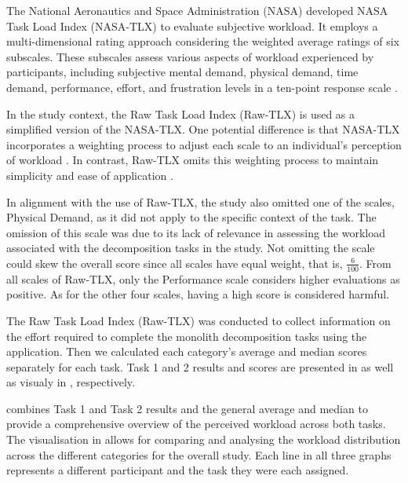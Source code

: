 The National Aeronautics and Space Administration (NASA) developed NASA Task
Load Index (NASA-TLX) to evaluate subjective workload. It employs a
multi-dimensional rating approach considering the weighted average ratings of
six subscales. These subscales assess various aspects of workload experienced
by participants, including subjective mental demand, physical demand, time
demand, performance, effort, and frustration levels in a ten-point response
scale \cite{hart1988development}.

In the study context, the Raw Task Load Index (Raw-TLX) is used as a simplified
version of the NASA-TLX. One potential difference is that NASA-TLX incorporates
a weighting process to adjust each scale to an individual's perception of
workload \cite{hart1988development}. In contrast, Raw-TLX omits this weighting
process to maintain simplicity and ease of application \cite{hart2006nasa}.

In alignment with the use of Raw-TLX, the study also omitted one of the scales,
Physical Demand, as it did not apply to the specific context of the task. The
omission of this scale was due to its lack of relevance in assessing the
workload associated with the decomposition tasks in the study. Not omitting the
scale could skew the overall score since all scales have equal weight, that is,
\( \frac{6}{100} \). From all scales of Raw-TLX, only the Performance scale
considers higher evaluations as positive. As for the other four scales, having
a high score is considered harmful.

The Raw Task Load Index (Raw-TLX) was conducted to collect information on the
effort required to complete the monolith decomposition tasks using the
application. Then we calculated each category's average and median scores
separately for each task. Task 1 and 2 results and scores are presented in
 as well as visualy in
, respectively.

 combines Task 1 and Task 2 results and the general
average and median to provide a comprehensive overview of the perceived
workload across both tasks. The visualisation in 
allows for comparing and analysing the workload distribution across the
different categories for the overall study. Each line in all three graphs
represents a different participant and the task they were each assigned.

